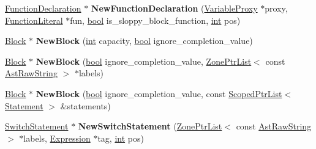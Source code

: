 \begin{DoxyCompactItemize}
\mbox{\hyperlink{classv8_1_1internal_1_1FunctionDeclaration}{Function\+Declaration}} $\ast$ {\bfseries New\+Function\+Declaration} (\mbox{\hyperlink{classv8_1_1internal_1_1VariableProxy}{Variable\+Proxy}} $\ast$proxy, \mbox{\hyperlink{classv8_1_1internal_1_1FunctionLiteral}{Function\+Literal}} $\ast$fun, \mbox{\hyperlink{classbool}{bool}} is\+\_\+sloppy\+\_\+block\+\_\+function, \mbox{\hyperlink{classint}{int}} pos)
\item 
\mbox{\label{classv8_1_1internal_1_1AstNodeFactory_aef7d4a1b58b4d25b35d6206045f8e2be}} 
\mbox{\hyperlink{classv8_1_1internal_1_1Block}{Block}} $\ast$ {\bfseries New\+Block} (\mbox{\hyperlink{classint}{int}} capacity, \mbox{\hyperlink{classbool}{bool}} ignore\+\_\+completion\+\_\+value)
\item 
\mbox{\label{classv8_1_1internal_1_1AstNodeFactory_a125b1a55279079c18ab638fc47f4d711}} 
\mbox{\hyperlink{classv8_1_1internal_1_1Block}{Block}} $\ast$ {\bfseries New\+Block} (\mbox{\hyperlink{classbool}{bool}} ignore\+\_\+completion\+\_\+value, \mbox{\hyperlink{classv8_1_1internal_1_1ZoneList}{Zone\+Ptr\+List}}$<$ const \mbox{\hyperlink{classv8_1_1internal_1_1AstRawString}{Ast\+Raw\+String}} $>$ $\ast$labels)
\item 
\mbox{\label{classv8_1_1internal_1_1AstNodeFactory_ae8b4a6279d601c0329002e0bb2f3cd0d}} 
\mbox{\hyperlink{classv8_1_1internal_1_1Block}{Block}} $\ast$ {\bfseries New\+Block} (\mbox{\hyperlink{classbool}{bool}} ignore\+\_\+completion\+\_\+value, const \mbox{\hyperlink{classv8_1_1internal_1_1ScopedPtrList}{Scoped\+Ptr\+List}}$<$ \mbox{\hyperlink{classv8_1_1internal_1_1Statement}{Statement}} $>$ \&statements)
\item 
\mbox{\label{classv8_1_1internal_1_1AstNodeFactory_a200cf4175841fdf80735b96235a1a208}} 
\mbox{\hyperlink{classv8_1_1internal_1_1SwitchStatement}{Switch\+Statement}} $\ast$ {\bfseries New\+Switch\+Statement} (\mbox{\hyperlink{classv8_1_1internal_1_1ZoneList}{Zone\+Ptr\+List}}$<$ const \mbox{\hyperlink{classv8_1_1internal_1_1AstRawString}{Ast\+Raw\+String}} $>$ $\ast$labels, \mbox{\hyperlink{classv8_1_1internal_1_1Expression}{Expression}} $\ast$tag, \mbox{\hyperlink{classint}{int}} pos)
\item 
\mbox{\label{classv8_1_1internal_1_1AstNodeFactory_a8bbfaba6e0f3a6ffd38784a5fb19b76b}} 

\end{DoxyCompactItemize}
